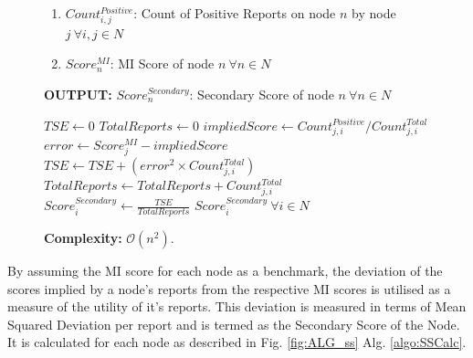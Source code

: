 \documentclass[journal]{IEEEtran}
\begin{document}
\begin{figure}[!t]
\begin{algorithm}[H]
\begin{enumerate}
		\item $Count^{Positive}_{i,j}$: Count of Positive Reports on node $ n $ by node $ j \ \forall i,j\in N $
		\item $Score^{MI}_n$: MI Score of node $n\ \forall n\in N$
	\end{enumerate}
	\textbf{OUTPUT:} $Score^{Secondary}_n$: Secondary Score of node $n\ \forall n\in N$
	\begin{algorithmic}
			\STATE $TSE \leftarrow 0$
			\STATE $ TotalReports \leftarrow 0 $
				\STATE $impliedScore \leftarrow Count^{Positive}_{j,i} / Count^{Total}_{j,i}$
				\STATE $ error \leftarrow Score^{MI}_j - impliedScore$
				\STATE $ TSE \leftarrow TSE + (error^2\times Count^{Total}_{j,i})$
				\STATE $ TotalReports \leftarrow TotalReports + Count^{Total}_{j,i}$
			\ENDFOR
			\STATE $ Score^{Secondary}_i \leftarrow \frac{TSE}{TotalReports}$
		\ENDFOR
		\RETURN $Score^{Secondary}_i\ \forall i\in N$ 
	\end{algorithmic}
	\textbf{Complexity:} $\mathcal{O}(n^2)$.
\end{algorithm}
\end{figure}
By assuming the MI score for each node as a benchmark, the deviation of the scores implied by a node's reports from the respective MI scores is utilised as a measure of the utility of it's reports. This deviation is measured in terms of Mean Squared Deviation per report and is termed as the Secondary Score of the Node. It is calculated for each node as described in Fig. \ref{fig:ALG_ss} Alg. \ref{algo:SSCalc}.
\end{document}
